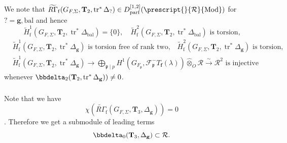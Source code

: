 \documentclass[10pt]{amsart}
\numberwithin{equation}{section}
\theoremstyle{definition}
\theoremstyle{remark} %
\DeclareMathOperator{\tr}{{tr}^*}
\renewcommand{\b}{\mathrm{bal}}
\newcommand{\f}{\mathbf{f}}
\newcommand{\scrF}{\mathscr{F}}
\newcommand{\g}{\mathbf{g}}
\newcommand{\p}{\mathfrak{p}}
\newcommand{\R}{\mathcal{R}}
\newcommand{\T}{\mathbf{T}}
\newcommand{\hotimes}{\widehat{\otimes}}
\begin{document}
		We note that $\widetilde{R\Gamma}_{\mathrm{f}}(G_{F,\Sigma},\T_2, \operatorname{tr}^*\Delta_?) \in D_{\mathrm{parf}}^{[1,2]}(\prescript{}{\R}{\mathrm{Mod}}) $ for $?=\g, \b $ and hence 
		\begin{equation}
			\widetilde{H}^1_{\mathrm{f}}(G_{F,\Sigma}, \T_2, \operatorname{tr}^*\Delta_{\mathrm{bal}}) = \{0\}, \quad \widetilde{H}^2_{\mathrm{f}}(G_{F,\Sigma}, \T_2, \operatorname{tr}^*\Delta_{\mathrm{bal}}) \text{ is torsion,}
		\end{equation}
		\begin{equation}
			\begin{split}
				& \widetilde{H}^1_{\mathrm{f}}(G_{F,\Sigma}, \T_2, \operatorname{tr}^*\Delta_{\g}) \text{ is torsion free of rank two,} \quad \widetilde{H}^2_{\mathrm{f}}(G_{F,\Sigma}, \T_2, \operatorname{tr}^*\Delta_{\g}) \text{ is torsion,} \\
				&  \widetilde{H}^1_{\mathrm{f}}(G_{F,\Sigma}, \T_2, \operatorname{tr}^*\Delta_{\g})\rightarrow \bigoplus_{\p \mid p}H^1(G_{F_{\p}},\scrF^-_{\p} T_{\f}( \lambda)) \hotimes_O \R \xrightarrow{\sim} \R^2 \text{ is injective}
			\end{split}
		\end{equation}
		whenever $  \bbdelta_2(\T_{2}, \tr \Delta_{\g})) \ne 0 $.
		
		
		\subsubsection{}
		Note that we have $$\chi(\widetilde{R\Gamma}_{\mathrm{f}}(G_{F,\Sigma},\T_{3},\Delta_{\g})) =0$$. Therefore we get a submodule of leading terms
		\begin{equation}
			\bbdelta_0(\T_{3},\Delta_{\g})  \subset \R.
		\end{equation}
		
\end{document}
